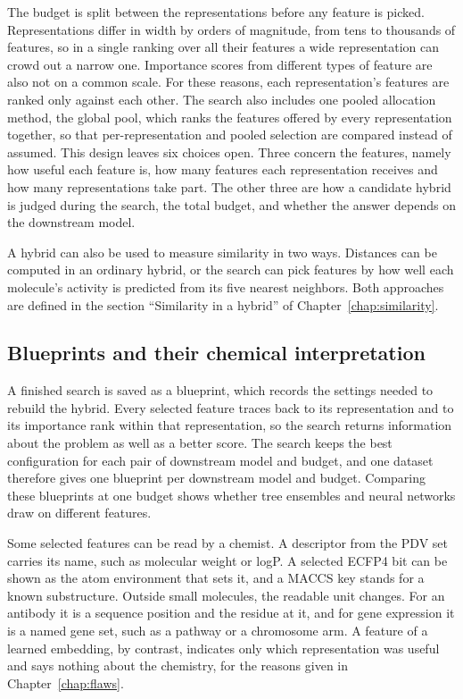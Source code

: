 The budget is split between the representations before any feature is picked. Representations differ in width by orders of magnitude, from tens to thousands of features, so in a single ranking over all their features a wide representation can crowd out a narrow one. Importance scores from different types of feature are also not on a common scale. For these reasons, each representation's features are ranked only against each other. The search also includes one pooled allocation method, the global pool, which ranks the features offered by every representation together, so that per-representation and pooled selection are compared instead of assumed. This design leaves six choices open. Three concern the features, namely how useful each feature is, how many features each representation receives and how many representations take part. The other three are how a candidate hybrid is judged during the search, the total budget, and whether the answer depends on the downstream model.

A hybrid can also be used to measure similarity in two ways. Distances can be computed in an ordinary hybrid, or the search can pick features by how well each molecule's activity is predicted from its five nearest neighbors. Both approaches are defined in the section ``Similarity in a hybrid'' of Chapter~\ref{chap:similarity}.


\subsection{Blueprints and their chemical interpretation}

A finished search is saved as a blueprint, which records the settings needed to rebuild the hybrid. Every selected feature traces back to its representation and to its importance rank within that representation, so the search returns information about the problem as well as a better score. The search keeps the best configuration for each pair of downstream model and budget, and one dataset therefore gives one blueprint per downstream model and budget. Comparing these blueprints at one budget shows whether tree ensembles and neural networks draw on different features.

Some selected features can be read by a chemist. A descriptor from the PDV set carries its name, such as molecular weight or logP. A selected ECFP4 bit can be shown as the atom environment that sets it, and a MACCS key stands for a known substructure. Outside small molecules, the readable unit changes. For an antibody it is a sequence position and the residue at it, and for gene expression it is a named gene set, such as a pathway or a chromosome arm. A feature of a learned embedding, by contrast, indicates only which representation was useful and says nothing about the chemistry, for the reasons given in Chapter~\ref{chap:flaws}.

